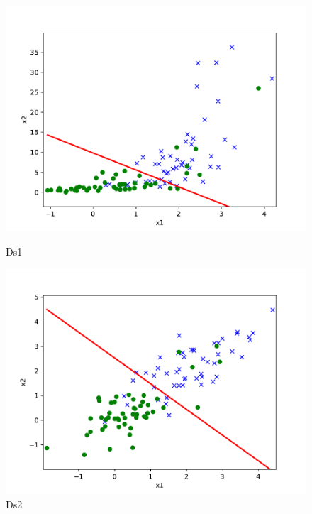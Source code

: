 \begin{answer}
	\begin{figure}[htpb]
		\centering
		\begin{minipage}[b]{0.46\linewidth}
			\centering
			\includegraphics[width=\linewidth]{ds1.pdf}
			\caption{Ds1}%
		\end{minipage}
		\begin{minipage}[b]{0.46\linewidth}
			\centering
			\includegraphics[width=\linewidth]{ds2.pdf}
			\caption{Ds2}%
		\end{minipage}
	\end{figure}
\end{answer}
